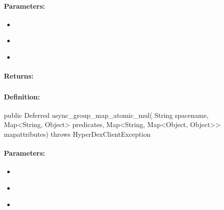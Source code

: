 \paragraph{Parameters:}
\begin{itemize}[noitemsep]
\item {}\\

\item {}\\

\item {}\\

\end{itemize}

\paragraph{Returns:}


\pagebreak
\subsubsection{}
\label{api:java:async_group_map_atomic_mul}


\paragraph{Definition:}
\begin{javacode}
public Deferred async_group_map_atomic_mul(
        String spacename,
        Map<String, Object> predicates,
        Map<String, Map<Object, Object>> mapattributes) throws HyperDexClientException
\end{javacode}

\paragraph{Parameters:}
\begin{itemize}[noitemsep]
\item {}\\

\item {}\\

\item {}\\

\end{itemize}


